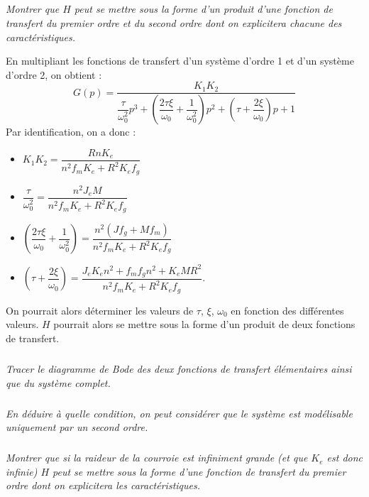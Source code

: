 \documentclass[10pt,fleqn]{article} %
\begin{document}
\begin{multicols}{2}
\begin{corrige}
\end{corrige}
\else
\fi
\subparagraph{} \textit{Montrer que $H$ peut se mettre sous la forme d'un produit d'une fonction de transfert du premier ordre et du second ordre dont on explicitera chacune des caractéristiques.}
\ifprof
\begin{corrige}
En multipliant les fonctions de transfert d'un système d'ordre 1 et d'un système d'ordre 2, on obtient : 
$$
G(p)= \dfrac{K_1 K_2}{
\dfrac{\tau}{\omega_0^2} p^3 
+ \left(\dfrac{2\tau \xi}{\omega_0}  +\dfrac{1}{\omega_0^2} \right) p^2
+ \left(\tau + \dfrac{2\xi}{\omega_0}  \right)p
+1}
$$
Par identification, on a donc : 
\begin{itemize}[label=,font=\color{violet}] 
\item $K_1 K_2 = \dfrac{R n K_e}{n^2 f_m K_e + R^2 K_e f_g}$ 
\item $ \dfrac{\tau}{\omega_0^2} = \dfrac{n^2J_e M}{n^2 f_m K_e + R^2 K_e f_g}$
\item $\left(\dfrac{2\tau \xi}{\omega_0}  +\dfrac{1}{\omega_0^2} \right) = \dfrac{n^2\left(Jf_g + M f_m \right)}{n^2 f_m K_e + R^2 K_e f_g}$
\item $\left(\tau + \dfrac{2\xi}{\omega_0}  \right) = \dfrac{ J_e K_e n^2 + f_m f_g n^2 + K_e M R^2 }{n^2 f_m K_e + R^2 K_e f_g}$.
\end{itemize}

On pourrait alors déterminer les valeurs de $\tau$, $\xi$, $\omega_0$ en fonction des différentes valeurs. $H$ pourrait alors se mettre sous la forme d'un produit de deux fonctions de transfert.
\end{corrige}
\else
\fi

\subparagraph{} \textit{Tracer le diagramme de Bode des deux fonctions de transfert élémentaires ainsi que du système complet.}
\ifprof
\begin{corrige}
\end{corrige}
\else
\fi

\subparagraph{} \textit{En déduire à quelle condition, on peut considérer que le système est modélisable uniquement par un second ordre.}
\ifprof
\begin{corrige}
\end{corrige}
\else
\fi

\subparagraph{} \textit{Montrer que si la raideur de la courroie est infiniment grande (et que $K_e$ est donc infinie) $H$ peut se mettre sous la forme d'une fonction de transfert du premier ordre dont on explicitera les caractéristiques.}
\ifprof
\begin{corrige}
\end{corrige}
\else
\fi

\ifprof
\else
\end{multicols}
\fi
\end{document}
